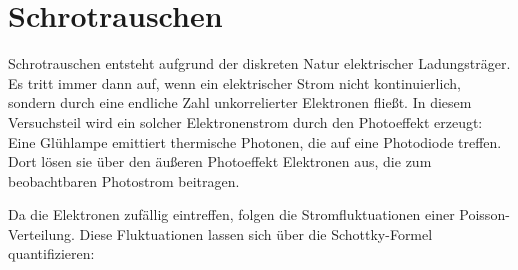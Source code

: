 



%

\section{Schrotrauschen}

Schrotrauschen entsteht aufgrund der diskreten Natur elektrischer Ladungsträger. 
Es tritt immer dann auf, wenn ein elektrischer Strom nicht kontinuierlich, sondern durch eine endliche Zahl unkorrelierter Elektronen fließt. 
In diesem Versuchsteil wird ein solcher Elektronenstrom durch den Photoeffekt erzeugt: Eine Glühlampe emittiert thermische Photonen, die auf eine Photodiode treffen. 
Dort lösen sie über den äußeren Photoeffekt Elektronen aus, die zum beobachtbaren Photostrom beitragen.

Da die Elektronen zufällig eintreffen, folgen die Stromfluktuationen einer Poisson-Verteilung. 
Diese Fluktuationen lassen sich über die Schottky-Formel quantifizieren:

